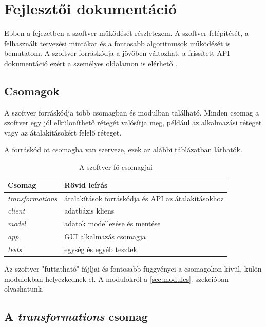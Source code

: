 \chapter{Fejlesztői dokumentáció}
\label{ch:impl}

Ebben a fejezetben a szoftver működését részletezem.
A szoftver felépítését, a felhasznált tervezési mintákat és
a fontosabb algoritmusok működését is bemutatom.
A szoftver forráskódja a jövőben változhat,
a frissített API dokumentáció ezért a személyes oldalamon is elérhető \cite{apidoc}.

\section{Csomagok}

A szoftver forráskódja több csomagban és modulban található.
Minden csomag a szoftver egy jól elkülöníthető rétegét valósítja meg,
például az alkalmazási réteget vagy az átalakításokért felelő réteget.

A forráskód öt csomagba van szerveze, ezek az alábbi táblázatban láthatók.

\begin{table}[H]
	\centering
	\begin{tabular}{ | m{} | m{} | }
		\hline
		\textbf{Csomag} & \textbf{Rövid leírás} \\
		\hline \hline
		\emph{transformations} & átalakítások forráskódja és API az átalakításokhoz \\
		\hline
		\emph{client} & adatbázis kliens \\
		\hline
		\emph{model} & adatok modellezése és mentése \\
		\hline
		\emph{app} & GUI alkalmazás csomagja \\
		\hline
		\emph{tests} & egység és egyéb tesztek \\
		\hline
	\end{tabular}
	\caption{A szoftver fő csomagjai}
	\label{tab:packages}
\end{table}

Az szoftver "futtatható" fájljai és fontosabb függvényei
a csomagokon kívül, külön modulokban helyezkednek el.
A modulokról a \ref{sec:modules}. szekcióban olvashatunk.

\section{A \emph{transformations} csomag}

